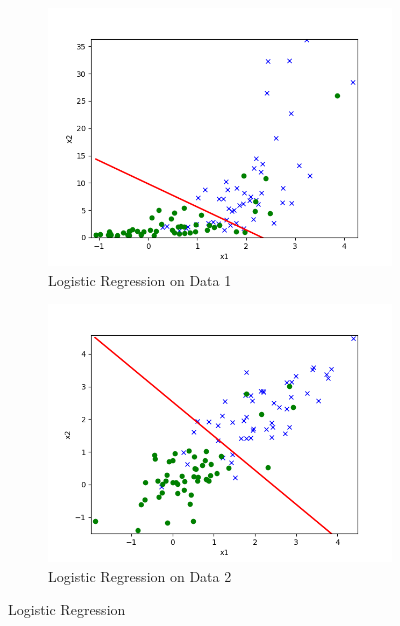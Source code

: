 \begin{answer}

\begin{figure}[h!]
\centering
\begin{subfigure}{.5\textwidth}
  \centering
  \includegraphics[width=.75\linewidth]{linearclass/logreg_pred_1.png}
  \caption{Logistic Regression  on Data 1}
  \label{fig:sub1}
\end{subfigure}%
\begin{subfigure}{.5\textwidth}
  \centering
  \includegraphics[width=.75\linewidth]{linearclass/logreg_pred_2.png}
  \caption{Logistic Regression on Data 2}
  \label{fig:sub2}
\end{subfigure}
\caption{Logistic Regression }
\label{fig:test}
\end{figure}
\end{answer}
